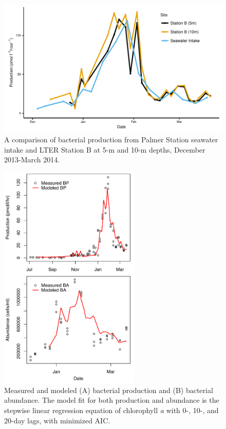 \begin{figure}[ht!] 
\centering 
\includegraphics[width=1.0\textwidth]{Chapter_3_SWI/Figures/Supplemental_Figure_3_BP_Comparison_Across_Sites} 
\caption[Comparison of bacterial production in the Palmer Station seawater intake and at Palmer LTER Station B.]{A comparison of bacterial production from Palmer Station seawater intake and LTER Station B at 5-m and 10-m depths, December 2013-March 2014.} 
\label{fig:ch2:bpcomp} 
\end{figure}

\begin{figure}[ht!] 
\centering 
\includegraphics[width=0.6\textwidth]{Chapter_3_SWI/Figures/Supplemental_Figure_4_BP_and_BA_models} 
\caption[Measured bacterial production and abundance and values predicted through a distributed lag model.]{Measured and modeled (A) bacterial production and (B) bacterial abundance. The model fit for both production and abundance is the stepwise linear regression equation of chlorophyll \emph{a} with 0-, 10-, and 20-day lags, with minimized AIC.} 
\label{fig:supp2_6} 
\end{figure}


